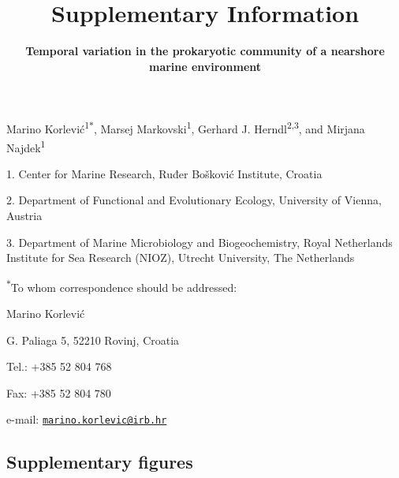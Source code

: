 \documentclass[
  12pt,
]{article}
\title{\textbf{Supplementary Information}}
\subtitle{\textbf{Temporal variation in the prokaryotic community of a
nearshore marine environment}}
\author{}
\date{\vspace{-2.5em}}
\begin{document}
\maketitle

\vspace{10mm}

Marino Korlević\textsuperscript{1\(*\)}, Marsej
Markovski\textsuperscript{1}, Gerhard J. Herndl\textsuperscript{2,3},
and Mirjana Najdek\textsuperscript{1}

1. Center for Marine Research, Ruđer Bošković Institute, Croatia

2. Department of Functional and Evolutionary Ecology, University of
Vienna, Austria

3. Department of Marine Microbiology and Biogeochemistry, Royal
Netherlands Institute for Sea Research (NIOZ), Utrecht University, The
Netherlands

\textsuperscript{\(*\)}To whom correspondence should be addressed:

Marino Korlević

G. Paliaga 5, 52210 Rovinj, Croatia

Tel.: +385 52 804 768

Fax: +385 52 804 780

e-mail:
\href{mailto:marino.korlevic@irb.hr}{\nolinkurl{marino.korlevic@irb.hr}}

\newpage
{}
\setlength\parindent{24pt}

\hypertarget{supplementary-figures}{%
\subsection{Supplementary figures}\label{supplementary-figures}}
\end{document}
